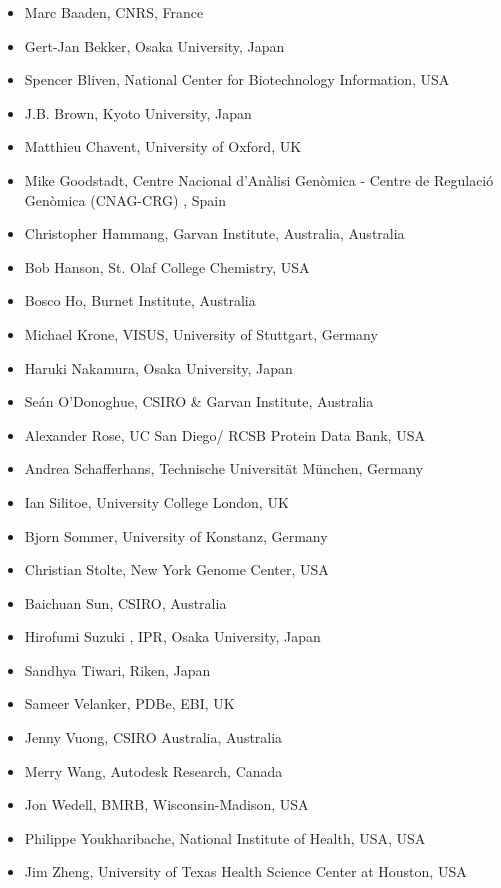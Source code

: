 \documentclass[a4paper]{article}
\begin{document}
\begin{itemize}
\item Marc Baaden, CNRS, France
\item Gert-Jan Bekker, Osaka University, Japan
\item Spencer Bliven, National Center for Biotechnology Information, USA
\item J.B. Brown, Kyoto University, Japan
\item Matthieu Chavent, University of Oxford, UK
\item Mike Goodstadt, Centre Nacional d'An\`{a}lisi Gen\`{o}mica - Centre de Regulaci\'{o} Gen\`{o}mica (CNAG-CRG) , Spain
\item Christopher Hammang, Garvan Institute, Australia, Australia
\item Bob Hanson, St. Olaf College Chemistry, USA
\item Bosco Ho, Burnet Institute, Australia
\item Michael Krone, VISUS, University of Stuttgart, Germany
\item Haruki Nakamura, Osaka University, Japan
\item Se\'{a}n O'Donoghue, CSIRO \& Garvan Institute, Australia
\item Alexander Rose, UC San Diego/ RCSB Protein Data Bank, USA
\item Andrea Schafferhans, Technische Universit\"{a}t M\"{u}nchen, Germany
\item Ian Silitoe, University College London, UK
\item Bjorn Sommer, University of Konstanz, Germany
\item Christian Stolte, New York Genome Center, USA
\item Baichuan Sun, CSIRO, Australia
\item Hirofumi Suzuki , IPR, Osaka University, Japan
\item Sandhya Tiwari, Riken, Japan
\item Sameer Velanker, PDBe, EBI, UK
\item Jenny Vuong, CSIRO Australia, Australia
\item Merry Wang, Autodesk Research, Canada
\item Jon Wedell, BMRB, Wisconsin-Madison, USA
\item Philippe Youkharibache, National Institute of Health, USA, USA
\item Jim Zheng, University of Texas Health Science Center at Houston, USA
\end{itemize}
\clearpage
\end{document}
